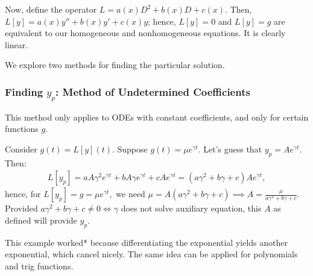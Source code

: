 Now, define the operator $L = a(x)D^2 + b(x)D + c(x)$. Then, $L[y] = a(x)y'' + b(x) y' + c(x)y$; hence, $L[y] = 0$ and $L[y] = g$ are equivalent to our homogeneous and nonhomogeneous equations. It is clearly linear.


We explore two methods for finding the particular solution.
\subsubsection{Finding \texorpdfstring{$y_p$}{Particular Solution}: Method of Undetermined Coefficients}

This method only applies to ODEs with constant coefficients, and only for certain functions $g$.

\begin{example}
    Consider $g(t) = L[y](t)$. Suppose $g(t) = \mu e^{\gamma t}$. Let's guess that $y_p = Ae^{\gamma t}$. Then:
\begin{align*}
    L[y_p] = aA \gamma^2 e^{\gamma t} + bA \gamma e^{\gamma t} + cA e^{\gamma t} = (a \gamma^2 + b \gamma + c) Ae^{\gamma t},
\end{align*}
hence, for $L[y_p] = g = \mu e^{\gamma t},$ we need $\mu = A(a \gamma^2 + b \gamma + c) \implies A  = \frac{\mu}{a\gamma^2 + b \gamma + c}$. Provided $a \gamma^2 + b \gamma + c \neq 0 \iff \gamma$ does not solve auxiliary equation, this $A$ as defined will provide $y_p$.
\end{example}

\begin{remark}
    This example worked* because differentiating the exponential yields another exponential, which cancel nicely. The same idea can be applied for polynomials and trig functions.
\end{remark}

